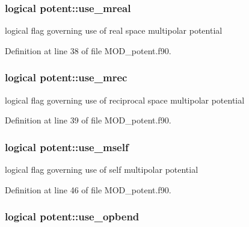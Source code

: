 \hypertarget{classpotent_a05e2d1fb2c7f8b1830a81783b56c5dc5}{
\subsubsection[{use\-\_\-mreal}]{\setlength{\rightskip}{0pt plus 5cm}logical potent\-::use\-\_\-mreal}}\label{classpotent_a05e2d1fb2c7f8b1830a81783b56c5dc5}


logical flag governing use of real space multipolar potential 



Definition at line 38 of file M\-O\-D\-\_\-potent.\-f90.

\hypertarget{classpotent_abf144fe64e3ac4d546a4e9a6c95c4c8a}{
\subsubsection[{use\-\_\-mrec}]{\setlength{\rightskip}{0pt plus 5cm}logical potent\-::use\-\_\-mrec}}\label{classpotent_abf144fe64e3ac4d546a4e9a6c95c4c8a}


logical flag governing use of reciprocal space multipolar potential 



Definition at line 39 of file M\-O\-D\-\_\-potent.\-f90.

\hypertarget{classpotent_a9860e6d722e3fabc21fdc89fe55d6fd4}{
\subsubsection[{use\-\_\-mself}]{\setlength{\rightskip}{0pt plus 5cm}logical potent\-::use\-\_\-mself}}\label{classpotent_a9860e6d722e3fabc21fdc89fe55d6fd4}


logical flag governing use of self multipolar potential 



Definition at line 46 of file M\-O\-D\-\_\-potent.\-f90.

\hypertarget{classpotent_a54b92cefe4749a50e302156f63ed7219}{
\subsubsection[{use\-\_\-opbend}]{\setlength{\rightskip}{0pt plus 5cm}logical potent\-::use\-\_\-opbend}}\label{classpotent_a54b92cefe4749a50e302156f63ed7219}


